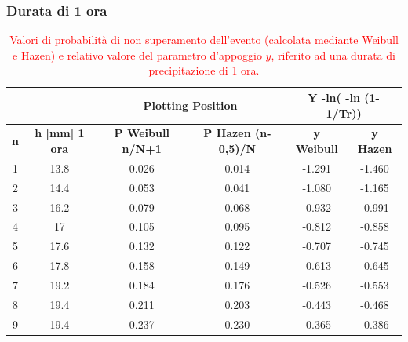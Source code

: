 \subsubsection{Durata di 1 ora}
\begin{table}[H] \centering
    \caption{\textcolor{red}{Valori di probabilità di non superamento dell'evento (calcolata mediante Weibull e Hazen) e relativo valore del parametro d'appoggio $y$, riferito ad una durata di precipitazione di 1 ora.}}
    \begin{tabular}{cccccc}
        &  & \multicolumn{2}{c}{\textbf{Plotting Position}} & \multicolumn{2}{c}{\textbf{Y -ln( -ln (1- 1/Tr))}}\\
        \toprule
           \textbf{n} & \textbf{h [mm] 1 ora} & \textbf{P Weibull   n/N+1} & \textbf{P Hazen  (n-0,5)/N} & \textbf{y Weibull} & \textbf{y Hazen}\\
       \midrule
    1          & 13.8                      & 0.026                      & 0.014                       & -1.291                  & -1.460                  \\
    2          & 14.4                      & 0.053                      & 0.041                       & -1.080                  & -1.165                  \\
    3          & 16.2                      & 0.079                      & 0.068                       & -0.932                  & -0.991                  \\
    4          & 17                        & 0.105                      & 0.095                       & -0.812                  & -0.858                  \\
    5          & 17.6                      & 0.132                      & 0.122                       & -0.707                  & -0.745                  \\
    6          & 17.8                      & 0.158                      & 0.149                       & -0.613                  & -0.645                  \\
    7          & 19.2                      & 0.184                      & 0.176                       & -0.526                  & -0.553                  \\
    8          & 19.4                      & 0.211                      & 0.203                       & -0.443                  & -0.468                  \\
    9          & 19.4                      & 0.237                      & 0.230                       & -0.365                  & -0.386                  \\

\end{tabular}
\end{table}
